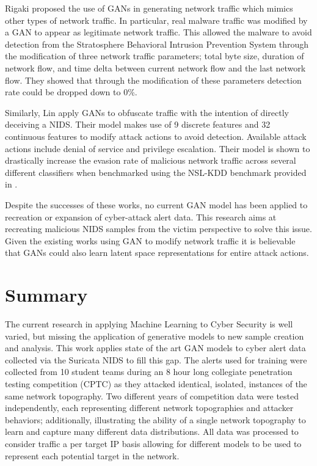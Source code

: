 Rigaki \etal \cite{Rigaki2018} proposed the use of GANs in generating network traffic which mimics other types of network traffic. In particular, real malware traffic was modified by a GAN to appear as legitimate network traffic. This allowed the malware to avoid detection from the Stratosphere Behavioral Intrusion Prevention System through the modification of three network traffic parameters; total byte size, duration of network flow, and time delta between current network flow and the last network flow. They showed that through the modification of these parameters detection rate could be dropped down to 0\%. 

Similarly, Lin \etal \cite{Lin2018} apply GANs to obfuscate traffic with the intention of directly deceiving a NIDS. Their model makes use of 9 discrete features and 32 continuous features to modify attack actions to avoid detection. Available attack actions include denial of service and privilege escalation. Their model is shown to drastically increase the evasion rate of malicious network traffic across several different classifiers when benchmarked using the NSL-KDD benchmark provided in \cite{Hu2015}.

Despite the successes of these works, no current GAN model has been applied to recreation or expansion of cyber-attack alert data. This research aims at recreating malicious NIDS samples from the victim perspective to solve this issue. Given the existing works using GAN to modify network traffic it is believable that GANs could also learn latent space representations for entire attack actions. 

\section{Summary}

The current research in applying Machine Learning to Cyber Security is well varied, but missing the application of generative models to new sample creation and analysis. This work applies state of the art GAN models to cyber alert data collected via the Suricata NIDS to fill this gap. The alerts used for training were collected from 10 student teams during an 8 hour long collegiate penetration testing competition (CPTC) as they attacked identical, isolated, instances of the same network topography. Two different years of competition data were tested independently, each representing different network topographies and attacker behaviors; additionally, illustrating the ability of a single network topography to learn and capture many different data distributions. All data was processed to consider traffic a per target IP basis allowing for different models to be used to represent each potential target in the network. 


